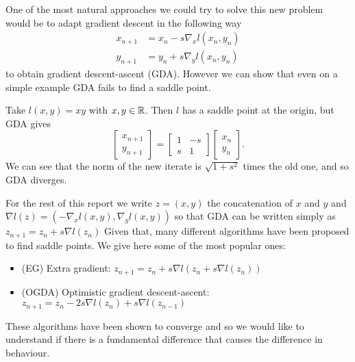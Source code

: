\documentclass[main.tex]{subfiles}
\begin{document}
One of the most natural approaches we could try to solve this new problem would
be to adapt gradient descent in the following way
\begin{align*}
	x_{n+1}   & = x_n - s \nabla_x l(x_n, y_n) \\
	y_{n + 1} & = y_n + s \nabla_y l(x_n, y_n)
\end{align*}
to obtain gradient descent-ascent (GDA). However we can show that even on a
simple example GDA fails to find a saddle point.
\begin{ex}
	Take $l(x,y) = xy$ with $x, y \in \mathbb{R}$. Then $l$ has a saddle point at the origin, but GDA gives
	\[
		\begin{bmatrix}
			x_{n+1} \\
			y_{n+1}
		\end{bmatrix}
		= \begin{bmatrix}
			1    & - s \\
			s & 1
		\end{bmatrix}
		\begin{bmatrix}
			x_n \\
			y_n
		\end{bmatrix}.
	\]
	We can see that the norm of the new iterate is $\sqrt{1 + s^2}$ times
	the old one, and so GDA diverges.
\end{ex}
For the rest of this report we write $z = (x,y)$ the concatenation of $x$ and
$y$ and $\nabla l(z) = (-\nabla_x l(x,y), \nabla_y l(x,y))$ so that GDA can be
written simply as $z_{n+1} = z_n + s \nabla l(z_n)$
Given that, many different algorithms have been proposed to find saddle points.
We give here some of the most popular ones:
\begin{itemize}
	\item (EG) Extra gradient: $z_{n+1} = z_n + s \nabla l(z_n + s \nabla l(z_n))$
	\item (OGDA) Optimistic gradient descent-ascent: $z_{n+1} = z_n - 2s \nabla l(z_n) + s \nabla l(z_{n-1})$
\end{itemize}
These algorithms have been shown to converge  and so we would like to understand if there is a fundamental difference
that causes the difference in behaviour.
\end{document}
